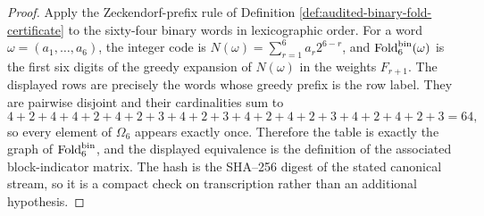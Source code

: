 \begin{proof}
Apply the Zeckendorf-prefix rule of Definition \ref{def:audited-binary-fold-certificate} to the sixty-four binary words in lexicographic order.  For a word \(\omega=(a_1,\ldots,a_6)\), the integer code is \(N(\omega)=\sum_{r=1}^6a_r2^{6-r}\), and \(\operatorname{Fold}_6^{\mathrm{bin}}(\omega)\) is the first six digits of the greedy expansion of \(N(\omega)\) in the weights \(F_{r+1}\).  The displayed rows are precisely the words whose greedy prefix is the row label.  They are pairwise disjoint and their cardinalities sum to
\[
4+2+4+4+2+4+2+3+4+2+3+4+2+4+2+3+4+2+4+2+3=64,
\]
so every element of \(\Omega_6\) appears exactly once.  Therefore the table is exactly the graph of \(\operatorname{Fold}_6^{\mathrm{bin}}\), and the displayed equivalence is the definition of the associated block-indicator matrix.  The hash is the SHA--256 digest of the stated canonical stream, so it is a compact check on transcription rather than an additional hypothesis. \qedhere
\end{proof}

